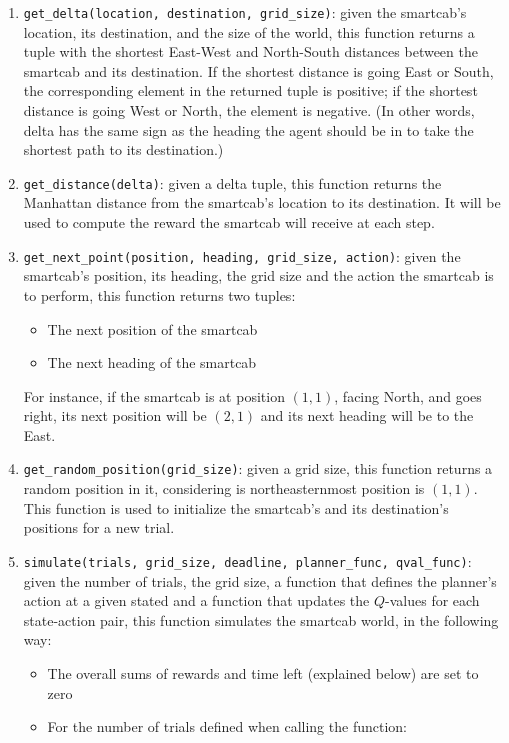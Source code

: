 \documentclass{article}
\begin{document}
\begin{enumerate}
    \item \texttt{get\_delta(location, destination, grid\_size)}: given the smartcab's location, its destination, and the size of the world, this function returns a tuple with the shortest East-West and North-South distances between the smartcab and its destination. If the shortest distance is going East or South, the corresponding element in the returned tuple is positive; if the shortest distance is going West or North, the element is negative. (In other words, delta has the same sign as the heading the agent should be in to take the shortest path to its destination.)
    \item \texttt{get\_distance(delta)}: given a delta tuple, this function returns the Manhattan distance from the smartcab's location to its destination. It will be used to compute the reward the smartcab will receive at each step.
    \item \texttt{get\_next\_point(position, heading, grid\_size, action)}: given the smartcab's position, its heading, the grid size and the action the smartcab is to perform, this function returns two tuples:
    \begin{itemize}
        \item The next position of the smartcab
	\item The next heading of the smartcab
    \end{itemize}
    For instance, if the smartcab is at position $(1, 1)$, facing North, and goes right, its next position will be $(2, 1)$ and its next heading will be to the East.
    \item \texttt{get\_random\_position(grid\_size)}: given a grid size, this function returns a random position in it, considering is northeasternmost position is $(1, 1)$. This function is used to initialize the smartcab's and its destination's positions for a new trial.
    \item \texttt{simulate(trials, grid\_size, deadline, planner\_func, qval\_func)}: given the number of trials, the grid size, a function that defines the planner's action at a given stated and a function that updates the $Q$-values for each state-action pair, this function simulates the smartcab world, in the following way:
    \begin{itemize}
        \item The overall sums of rewards and time left (explained below) are set to zero
	\item For the number of trials defined when calling the function:

\end{itemize}
\end{enumerate}
\end{document}
